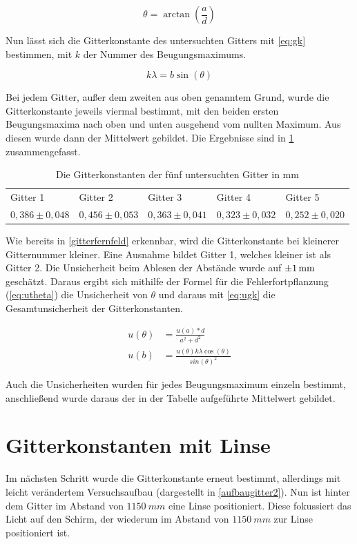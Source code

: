 \begin{equation}
	\theta = \arctan\left(\frac{a}{d}\right)
	\label{eq:sin}
\end{equation}

Nun lässt sich die Gitterkonstante des untersuchten Gitters mit \cref{eq:gk} bestimmen, mit $k$ der Nummer des Beugungsmaximums.

\begin{equation}
	k\lambda = b \sin(\theta)
	\label{eq:gk}
\end{equation}

Bei jedem Gitter, außer dem zweiten aus oben genanntem Grund, wurde die Gitterkonstante jeweils viermal bestimmt, mit den beiden ersten Beugungsmaxima nach oben und unten ausgehend vom nullten Maximum. Aus diesen wurde dann der Mittelwert gebildet. Die Ergebnisse sind in \cref{tab} zusammengefasst.

\begin{table}[h]
	\caption{Die Gitterkonstanten der fünf untersuchten Gitter in mm}
\begin{tabular}{lllll}
	Gitter 1 & Gitter 2& Gitter 3& Gitter 4& Gitter 5\\
	 $0,386\pm0,048$ & $0,456\pm0,053$ & $0,363\pm0,041$ & $0,323\pm0,032$ & $0,252\pm0,020$
\end{tabular}
\label{tab}
\end{table}

Wie bereits in \cref{gitterfernfeld} erkennbar, wird die Gitterkonstante bei kleinerer Gitternummer kleiner. Eine Ausnahme bildet Gitter 1, welches kleiner ist als Gitter 2.
Die Unsicherheit beim Ablesen der Abstände wurde auf $\SI{\pm1}{mm}$ geschätzt. Daraus ergibt sich mithilfe der Formel für die Fehlerfortpflanzung (\cref{eq:utheta}) die Unsicherheit von $\theta$ und daraus mit \cref{eq:ugk} die Gesamtunsicherheit der Gitterkonstanten.

\begin{align}
u(\theta) &= \frac{u(a)*d}{a^2 +d^2}
\label{eq:utheta}\\
u(b) &= \frac{u(\theta) k \lambda \cos(\theta)}{sin(\theta)^2}
\label{eq:ugk}
\end{align}

Auch die Unsicherheiten wurden für jedes Beugungsmaximum einzeln bestimmt, anschließend wurde daraus der in der Tabelle aufgeführte Mittelwert gebildet.

\section{Gitterkonstanten mit Linse}
Im nächsten Schritt wurde die Gitterkonstante erneut bestimmt, allerdings mit leicht verändertem Versuchsaufbau (dargestellt in \cref{aufbaugitter2}). Nun ist hinter dem Gitter im Abstand von $\SI{1150}{mm}$ eine Linse positioniert. Diese fokussiert das Licht auf den Schirm, der wiederum im Abstand von $\SI{1150}{mm}$ zur Linse positioniert ist.


